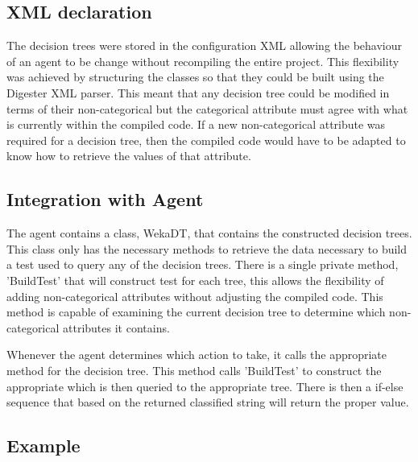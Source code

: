\subsection{XML declaration}

The decision trees were stored in the configuration XML allowing the behaviour of an agent to be change without
recompiling the entire project.  This flexibility was achieved by structuring the classes so that 
they could be built using the Digester XML parser.  This meant that any decision tree could be modified in 
terms of their non-categorical but the categorical attribute must agree with what is currently within the 
compiled code.  If a new non-categorical attribute was required for a decision tree, then the compiled code would
have to be adapted to know how to retrieve the values of that attribute.

\subsection{Integration with Agent}

The agent contains a class, WekaDT, that contains the constructed decision trees.  This class only has
the necessary methods to retrieve the data necessary to build a test used to query any of the decision
trees.  There is a single private method, 'BuildTest' that will construct test for each tree, this allows the flexibility
of adding non-categorical attributes without adjusting the compiled code.  This method is capable of
examining the current decision tree to determine which non-categorical attributes it contains.

Whenever the agent determines which action to take, it calls the appropriate method for the decision 
tree.  This method calls 'BuildTest' to construct the appropriate which is then queried to the
appropriate tree.  There is then a if-else sequence that based on the returned classified string
will return the proper value.

\subsection{Example}

